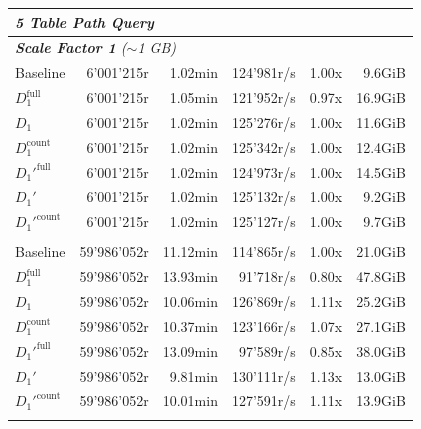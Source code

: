 \begin{longtable}{lrrrrr}
    \multicolumn{6}{l}{\textit{5 Table Path Query}} \\
    \midrule
    \multicolumn{6}{l}{\textit{\textbf{Scale Factor 1} ($\sim$1 GB)}} \\
    \nopagebreak
    Baseline              &  6'001'215r           &  1.02min             &  124'981r/s          & 1.00x             & 9.6GiB    \\
    $D_1^{\text{full}}$   &  6'001'215r           &  1.05min             &  121'952r/s          & 0.97x             & 16.9GiB   \\
    \quad $D_1$           &  6'001'215r           &  1.02min             &  125'276r/s          & 1.00x             & 11.6GiB   \\
    $D_1^{\text{count}}$  &  6'001'215r           &  1.02min             &  125'342r/s          & 1.00x             & 12.4GiB   \\
    $D_1'^{\text{full}}$  &  6'001'215r           &  1.02min             &  124'973r/s          & 1.00x             & 14.5GiB   \\
    \quad $D_1'$          &  6'001'215r           &  1.02min             &  125'132r/s          & 1.00x             & 9.2GiB    \\
    $D_1'^{\text{count}}$ &  6'001'215r           &  1.02min             &  125'127r/s          & 1.00x             & 9.7GiB    \\
    \addlinespace
    
    \multicolumn{6}{l}{\textit{\textbf{Scale Factor 10} ($\sim$10 GB)}} \\
    \nopagebreak
    Baseline              &  59'986'052r          &  11.12min            &  114'865r/s          & 1.00x             & 21.0GiB   \\
    $D_1^{\text{full}}$   &  59'986'052r          &  13.93min            &  91'718r/s           & 0.80x             & 47.8GiB   \\
    \quad $D_1$           &  59'986'052r          &  10.06min            &  126'869r/s          & 1.11x             & 25.2GiB   \\
    $D_1^{\text{count}}$  &  59'986'052r          &  10.37min            &  123'166r/s          & 1.07x             & 27.1GiB   \\
    $D_1'^{\text{full}}$  &  59'986'052r          &  13.09min            &  97'589r/s           & 0.85x             & 38.0GiB   \\
    \quad $D_1'$          &  59'986'052r          &  9.81min             &  130'111r/s          & 1.13x             & 13.0GiB   \\
    $D_1'^{\text{count}}$ &  59'986'052r          &  10.01min            &  127'591r/s          & 1.11x             & 13.9GiB   \\
    \addlinespace


\end{longtable}
